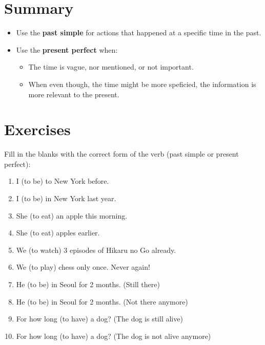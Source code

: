 \documentclass[12pt]{article}
\begin{document}
\section{Summary}

\begin{itemize}
  \item Use the \textbf{past simple} for actions that happened at a specific time in the past.
  \item Use the \textbf{present perfect} when:
    \begin{itemize}
      \item The time is vague, nor mentioned, or not important.
      \item When even though, the time might be more speficied, the information is more relevant to the present.
    \end{itemize}
\end{itemize}

\section{Exercises}

Fill in the blanks with the correct form of the verb (past simple or present perfect):

\begin{enumerate}
  \item I \customBlank (to be) to New York before.
  \item I \customBlank (to be) in New York last year.
  \item She \customBlank (to eat) an apple this morning.
  \item She \customBlank (to eat) apples earlier.
  \item We \customBlank (to watch) 3 episodes of Hikaru no Go already.
  \item We \customBlank (to play) chess only once. Never again!
  \item He \customBlank (to be) in Seoul for 2 months. (Still there)
  \item He \customBlank (to be) in Seoul for 2 months. (Not there anymore)
  \item For how long \customBlank (to have) a dog? (The dog is still alive)
  \item For how long \customBlank (to have) a dog? (The dog is not alive anymore)
\end{enumerate}
\end{document}
